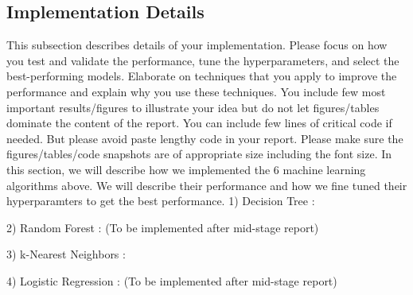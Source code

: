 \documentclass[conference]{IEEEtran}
\begin{document}
\subsection{Implementation Details}
This subsection describes details of your implementation. Please focus on how you test and validate the performance, tune the hyperparameters, and select the best-performing models. Elaborate on techniques that you apply to improve the performance and explain why you use these techniques. You include few most important results/figures to illustrate your idea but do not let figures/tables dominate the content of the report. You can include few lines of critical code if needed. But please avoid paste lengthy code in your report. Please make sure the figures/tables/code snapshots are of appropriate size including the font size.
In this section, we will describe how we implemented the 6 machine learning algorithms above. We will describe their performance and how we fine tuned their hyperparamters to get the best performance. 
1) Decision Tree :  

2) Random Forest :  (To be implemented after mid-stage report)

3) k-Nearest Neighbors :

4) Logistic Regression : (To be implemented after mid-stage report)
\end{document}
